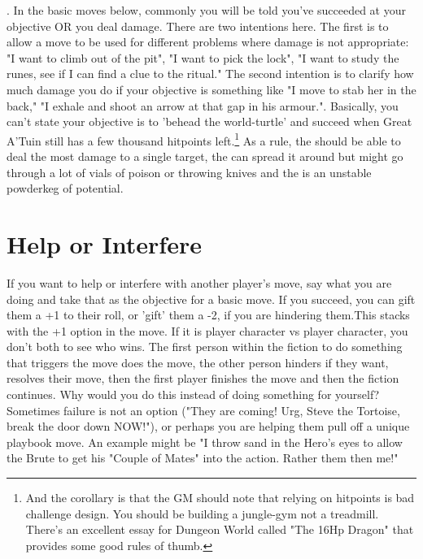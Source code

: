 \documentclass{tufte-book}
\begin{document}
 . In the basic moves below, commonly you will be told you've succeeded at your objective OR you deal damage. There are two intentions here. The first is to allow a move to be used for different problems where damage is not appropriate: "I want to climb out of the pit", "I want to pick the lock", "I want to study the runes, see if I can find a clue to the ritual." The second intention is to clarify how much damage you do if your objective is something like "I move to stab her in the back," "I exhale and shoot an arrow at that gap in his armour.". Basically, you can't state your objective is to 'behead the world-turtle' and succeed when Great A'Tuin still has a few thousand hitpoints left.\footnote{And the corollary is that the GM should note that relying on hitpoints is bad challenge design. You should be building a jungle-gym not a treadmill. There's an excellent essay for Dungeon World called "The 16Hp Dragon" that provides some good rules of thumb.} As a rule, the  should be able to deal the most damage to a single target, the  can spread it around but might go through a lot of vials of poison or throwing knives and the  is an unstable powderkeg of potential.
\bigskip

\section{Help or Interfere}

If you want to help or interfere with another player's move, say what you are doing and take that as the objective for a basic move. If you succeed, you can gift them a +1 to their roll, or 'gift' them a -2, if you are hindering them.This stacks with the +1 option in the  move. If it is player character vs player character, you don't both  to see who wins. The first person within the fiction to do something that triggers the move does the move, the other person hinders if they want, resolves their move, then the first player finishes the move and then the fiction continues.
Why would you do this instead of doing something for yourself? Sometimes failure is not an option ("They are coming! Urg, Steve the Tortoise, break the door down NOW!"), or perhaps you are helping them pull off a unique playbook move. An example might be "I throw sand in the Hero's eyes to allow the Brute to get his "Couple of Mates" into the action. Rather them then me!"
\end{document}
